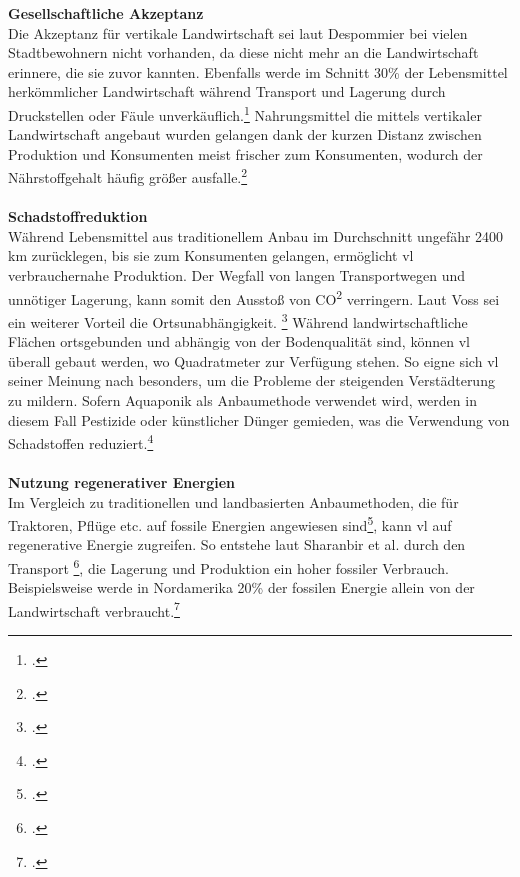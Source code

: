 \documentclass{scrartcl}
\begin{document}
\textbf{Gesellschaftliche Akzeptanz}\\
Die Akzeptanz für vertikale Landwirtschaft sei laut Despommier bei vielen Stadtbewohnern nicht vorhanden, da diese nicht mehr an die Landwirtschaft erinnere, die sie zuvor kannten.
Ebenfalls werde im Schnitt 30\% der Lebensmittel herkömmlicher Landwirtschaft während Transport und Lagerung durch Druckstellen oder Fäule unverkäuflich.\footcite{Despommier2009TheFarms}
Nahrungsmittel die  mittels vertikaler Landwirtschaft angebaut wurden gelangen dank der kurzen Distanz zwischen Produktion und Konsumenten meist frischer zum Konsumenten, wodurch der Nährstoffgehalt häufig größer ausfalle.\footcite{Despommier2009TheFarms}\\
\\
\textbf{Schadstoffreduktion}\\
Während Lebensmittel aus traditionellem Anbau im Durchschnitt ungefähr 2400 km zurücklegen, bis sie zum Konsumenten gelangen, ermöglicht \acs{vl} verbrauchernahe Produktion. Der Wegfall von langen Transportwegen und unnötiger Lagerung, kann somit den Ausstoß von CO\textsuperscript{2} verringern. 
Laut Voss sei ein weiterer Vorteil die Ortsunabhängigkeit. \footcite[S.7]{PeterMollerVoss2013VerticalRise} Während landwirtschaftliche Flächen ortsgebunden und abhängig von der Bodenqualität sind, können \acs{vl} überall gebaut werden, wo Quadratmeter zur Verfügung stehen. So eigne sich \acs{vl} seiner Meinung nach besonders, um die Probleme der steigenden Verstädterung zu mildern. Sofern Aquaponik als Anbaumethode verwendet wird, werden in diesem Fall Pestizide oder künstlicher Dünger gemieden, was die Verwendung von Schadstoffen reduziert.\footcite[Vgl.][S.10]{Al-Kodmany2018TheCity}\\
\\
\textbf{Nutzung regenerativer Energien}\\
Im Vergleich zu traditionellen und landbasierten Anbaumethoden, die für Traktoren, Pflüge etc. auf fossile Energien angewiesen sind\footcite[]{2012TheEssay}, kann \acs{vl} auf regenerative Energie zugreifen. So entstehe laut Sharanbir et al. durch den Transport \footcite[Vgl.][]{GrewalCanFood}, die Lagerung und Produktion ein hoher fossiler Verbrauch. Beispielsweise werde in Nordamerika 20\% der fossilen Energie allein von der Landwirtschaft verbraucht.\footcite[Vgl.][S.27]{Al-Kodmany2018TheCity}\\
\end{document}
